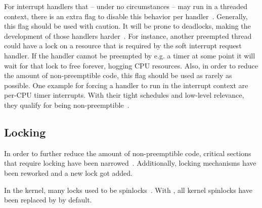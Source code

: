 \documentclass[10pt,twocolumn,a4paper]{article}
\begin{document}
For interrupt handlers that -- under no circumstances -- may run in a threaded context, there is an extra flag to disable this behavior per handler~\cite{lf:irq}.
Generally, this flag should be used with caution.
It will be prone to deadlocks, making the development of those handlers harder~\cite{mckenney_realtime_2005}.
For instance, another preempted thread could have a lock on a resource that is required by the soft interrupt request handler.
If the handler cannot be preempted by e.g. a timer at some point it will wait for that lock to free forever, hogging CPU resources.
Also, in order to reduce the amount of non-preemptible code, this flag should be used as rarely as possible.
One example for forcing a handler to run in the interrupt context are per-CPU timer interrupts.
With their tight schedules and low-level relevance, they qualify for being non-preemptible~\cite{mckenney_realtime_2005}.

\subsection{Locking}\label{subsec:locking}
In order to further reduce the amount of non-preemptible code, critical sections that require locking have been narrowed~\cite{mckenney_realtime_2005}.
Additionally, locking mechanisms have been reworked and a new lock got added.

In the kernel, many locks used to be spinlocks~\cite{lf:sleeping-spinlocks}.
With , all  kernel spinlocks have been replaced by  by default.
\end{document}
